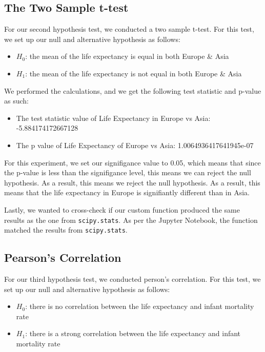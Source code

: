 \documentclass[a4paper, twocolumn]{article}
\begin{document}
\subsection{The Two Sample t-test}
For our second hypothesis test, we conducted a two sample t-test. For this test, we set up our null and alternative
hypothesis as follows:
\begin{itemize}
    \item $H_0$: the mean of the life expectancy is equal in both Europe \& Asia
    \item $H_1$: the mean of the life expectancy is not equal in both Europe \& Asia
\end{itemize}

We performed the calculations, and we get the following test statistic and p-value as such:
\begin{itemize}
    \item The test statistic value of Life Expectancy in Europe vs Asia:  -5.884174172667128 
    \item The p value of Life Expectancy of Europe vs Asia:  1.0064936417641945e-07
\end{itemize}

For this experiment, we set our signifigance value to 0.05, which means that since the p-value is less than the 
signifigance level, this means we can reject the null hypothesis. As a result, this means we reject the null
hypothesis. As a result, this means that the life expectancy in Europe is signifiantly different than in Asia.

Lastly, we wanted to cross-check if our custom function produced the same results as the one from 
\texttt{scipy.stats}. As per the Jupyter Notebook, the function matched the results from \texttt{scipy.stats}.

\subsection{Pearson's Correlation}
For our third hypothesis test, we conducted person's correlation. For this test, we set up our null and alternative
hypothesis as follows:
\begin{itemize}
    \item $H_0$: there is no correlation between the life expectancy and infant mortality rate
    \item $H_1$: there is a strong correlation between the life expectancy and infant mortality rate
\end{itemize}
\end{document}
